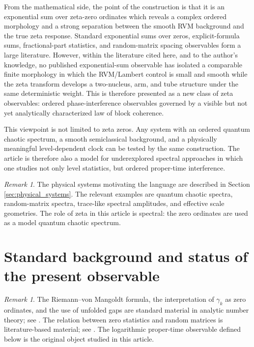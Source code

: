 \documentclass[11pt]{amsart}
\numberwithin{equation}{section}
\theoremstyle{plain}
\theoremstyle{definition}
\theoremstyle{remark}
\newtheorem{remark}[theorem]{Remark}
\begin{document}
From the mathematical side, the point of the construction is that it is an exponential sum over zeta-zero ordinates which reveals a complex ordered morphology and a strong separation between the smooth RVM background and the true zeta response.  Standard exponential sums over zeros, explicit-formula sums, fractional-part statistics, and random-matrix spacing observables form a large literature.  However, within the literature cited here, and to the author's knowledge, no published exponential-sum observable has isolated a comparable finite morphology in which the RVM/Lambert control is small and smooth while the zeta transform develops a two-nucleus, arm, and tube structure under the same deterministic weight.  This is therefore presented as a new class of zeta observables: ordered phase-interference observables governed by a visible but not yet analytically characterized law of block coherence.

This viewpoint is not limited to zeta zeros.  Any system with an ordered quantum chaotic spectrum, a smooth semiclassical background, and a physically meaningful level-dependent clock can be tested by the same construction.  The article is therefore also a model for underexplored spectral approaches in which one studies not only level statistics, but ordered proper-time interference.

\begin{remark}
\label{rem:introduction_physics_link}
The physical systems motivating the language are described in Section \ref{sec:physical_systems}.  The relevant examples are quantum chaotic spectra, random-matrix spectra, trace-like spectral amplitudes, and effective scale geometries.  The role of zeta in this article is spectral: the zero ordinates are used as a model quantum chaotic spectrum.
\end{remark}

\section{Standard background and status of the present observable}
\label{sec:standard_background_status}

\begin{remark}
\label{rem:standard_material}
The Riemann--von Mangoldt formula, the interpretation of \(\gamma_k\) as zero ordinates, and the use of unfolded gaps are standard material in analytic number theory; see \cite{Titchmarsh1986,Edwards2001,IwaniecKowalski2004}.  The relation between zero statistics and random matrices is literature-based material; see \cite{Montgomery1973,Odlyzko1987,KatzSarnak1999,RudnickSarnak1996,KeatingSnaith2000,ConreySnaith2008}.  The logarithmic proper-time observable defined below is the original object studied in this article.
\end{remark}
\end{document}

